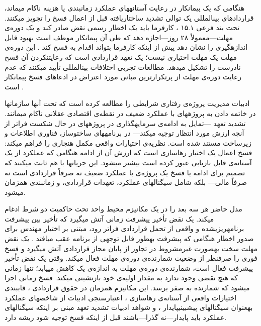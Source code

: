 هنگامی که یک پیمانکار در رعایت آستانه\zwnj{}های عملکرد زمان\zwnj{}بندی
یا هزینه ناکام می\zwnj{}ماند، قراردادهای بین\zwnj{}المللی 
یک توالی تشدید ساختاریافته قبل از اعمال فسخ را تجویز می\zwnj{}کنند.
تحت بند فرعی ۱۵.۱ ، کارفرما باید یک اخطار رسمی نقض
صادر کند و یک دوره‌ی مهلت---معمولاً ۲۸ روز---اجازه دهد
که طی آن پیمانکار موظف است بهبود قابل اندازه\zwnj{}گیری را نشان دهد
پیش از اینکه کارفرما بتواند اقدام به فسخ کند
\citep{FIDIC2017, Ndekugri2008}.
این دوره‌ی مهلت یک مهلت اختیاری نیست؛
یک تعهد قراردادی است که رعایت\zwnj{}نکردن آن
فسخ نادرست را تشکیل می\zwnj{}دهد.
مطالعات تجربی اختلافات بین\zwnj{}المللی  تأیید می\zwnj{}کنند
که عدم رعایت دوره‌ی مهلت از پرتکرارترین مبانی مورد اعتراض
در ادعاهای فسخ پیمانکار است \citep{Ndekugri2008, Ennis2021}.

ادبیات مدیریت پروژه‌ی رفتاری شرایطی را مطالعه کرده است
که تحت آن\zwnj{}ها سازمان\zwnj{}ها در خاتمه دادن به پروژه\zwnj{}های با عملکرد ضعیف
در نقطه‌ی اقتصادی عقلانی ناکام می\zwnj{}مانند.
تشدید تعهد \citep{Staw1987}---تمایل به ادامه‌ی سرمایه\zwnj{}گذاری
در پروژه\zwnj{}های در حال شکست فراتر از آنچه ارزش مورد انتظار توجیه می\zwnj{}کند---
در برنامه\zwnj{}های ساخت\zwnj{}وساز، فناوری اطلاعات و زیرساخت مستند شده است.
نظریه‌ی اختیارات واقعی \citep{Dixit1994, Huchzermeier2001}
مکمل هنجاری را فراهم می\zwnj{}کند: فسخ اعمال یک اختیار رهاسازی است
که ارزش آن از  ادامه هنگامی که عملکرد
از یک آستانه‌ی قابل بازیابی عبور کرده است بیشتر می\zwnj{}شود.
این جریان\zwnj{}ها با هم ثابت می\zwnj{}کنند که تصمیم برای ادامه یا فسخ
یک پروژه‌ی با عملکرد ضعیف
نه صرفاً قراردادی است نه صرفاً مالی---
بلکه شامل سیگنال\zwnj{}های عملکرد، تعهدات قراردادی،
و زمان\zwnj{}بندی همزمان می\zwnj{}شود.

مدل حاضر هر سه بعد را در یک مکانیزم محیط واحد
تحت حاکمیت دو شرط ادغام می\zwnj{}کند.
یک نقض تأخیر پیشرفت زمانی آتش می\zwnj{}گیرد که تأخیر بین
پیشرفت برنامه\zwnj{}ریزی\zwnj{}شده و واقعی از تحمل قراردادی فراتر رود،
مبتنی بر اختیار مهندس  برای صدور اخطار هنگامی که
پیشرفت به\zwnj{}طور قابل توجهی از برنامه عقب می\zwnj{}افتد \citep{FIDIC2017}.
یک نقض مهلت سخت به\zwnj{}صورت غیرمشروط در تجاوز از پایان
مجاز قراردادی آتش می\zwnj{}گیرد و فسخ فوری را
صرف\zwnj{}نظر از وضعیت شمارنده‌ی دوره‌ی مهلت فعال می\zwnj{}کند.
وقتی یک نقض تأخیر پیشرفت فعال است،
شمارنده‌ی دوره‌ی مهلت به اندازه‌ی یک کاهش می\zwnj{}یابد؛
تنها زمانی که هیچ نقضی وجود ندارد به مقدار اولیه‌ی خود بازنشینی می\zwnj{}کند.
فسخ زمانی اجرا می\zwnj{}شود که شمارنده به صفر برسد.
این مکانیزم همزمان در حقوق قراردادی 
\citep{FIDIC2017, Ndekugri2008}،
قاب\zwnj{}بندی اختیارات واقعی از آستانه‌ی رهاسازی
\citep{Dixit1994, Huchzermeier2001}،
اعتبارسنجی ادبیات  از شاخص\zwnj{}های عملکرد به\zwnj{}عنوان سیگنال\zwnj{}های
پیش\zwnj{}بینی\zwnj{}پایدار \citep{christensen1993est, Lipke2003}،
و شواهد ادبیات تشدید تعهد مبنی بر اینکه سیگنال\zwnj{}های عملکرد
باید پایدار---نه گذرا---باشند قبل از اینکه فسخ توجیه شود
\citep{Staw1987} ریشه دارد.

